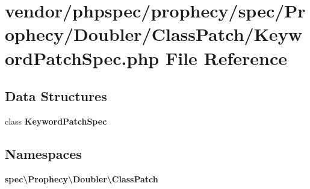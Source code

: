 \section{vendor/phpspec/prophecy/spec/\+Prophecy/\+Doubler/\+Class\+Patch/\+Keyword\+Patch\+Spec.php File Reference}
\label{_keyword_patch_spec_8php}
\subsection*{Data Structures}
\begin{DoxyCompactItemize}
\item 
class {\bf Keyword\+Patch\+Spec}
\end{DoxyCompactItemize}
\subsection*{Namespaces}
\begin{DoxyCompactItemize}
\item 
 {\bf spec\textbackslash{}\+Prophecy\textbackslash{}\+Doubler\textbackslash{}\+Class\+Patch}
\end{DoxyCompactItemize}
